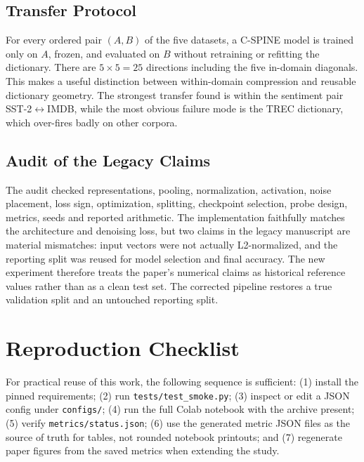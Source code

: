\documentclass[conference]{IEEEtran}
\begin{document}
\subsection{Transfer Protocol}
For every ordered pair $(A,B)$ of the five datasets, a C-SPINE model is
trained only on $A$, frozen, and evaluated on $B$ without retraining or
refitting the dictionary. There are $5\times5=25$ directions including the
five in-domain diagonals. This makes a useful distinction between
within-domain compression and reusable dictionary geometry. The strongest
transfer found is within the sentiment pair SST-2$\leftrightarrow$IMDB,
while the most obvious failure mode is the TREC dictionary, which
over-fires badly on other corpora.

\subsection{Audit of the Legacy Claims}
The audit checked representations, pooling, normalization, activation,
noise placement, loss sign, optimization, splitting, checkpoint selection,
probe design, metrics, seeds and reported arithmetic. The implementation
faithfully matches the architecture and denoising loss, but two claims in
the legacy manuscript are material mismatches: input vectors were not
actually L2-normalized, and the reporting split was reused for model
selection and final accuracy. The new experiment therefore treats the
paper's numerical claims as historical reference values rather than as a
clean test set. The corrected pipeline restores a true validation split
and an untouched reporting split.

\section{Reproduction Checklist}
For practical reuse of this work, the following sequence is sufficient:
(1) install the pinned requirements; (2) run
\texttt{tests/test\_smoke.py}; (3) inspect or edit a JSON config under
\texttt{configs/}; (4) run the full Colab notebook with the archive
present; (5) verify \texttt{metrics/status.json}; (6) use the generated
metric JSON files as the source of truth for tables, not rounded notebook
printouts; and (7) regenerate paper figures from the saved metrics when
extending the study.
\end{document}
